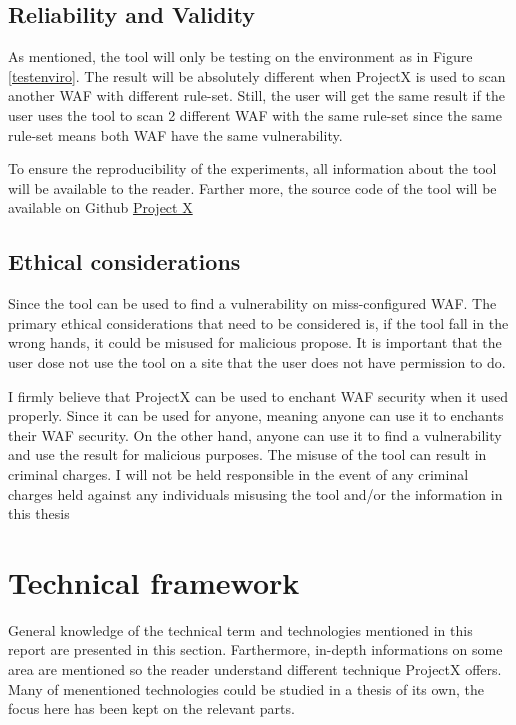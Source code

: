 \documentclass[a4paper,12pt]{article}
\begin{document}

\subsection{Reliability and Validity}
As mentioned, the tool will only be testing on the environment as in Figure \ref{testenviro}. The result will be absolutely different when ProjectX is used to scan another WAF with different rule-set. Still, the user will get the same result if the user uses the tool to scan 2 different WAF with the same rule-set since the same rule-set means both WAF have the same vulnerability. 

To ensure the reproducibility of the experiments, all information about the tool will be available to the reader. Farther more, the source code of the tool will be available on Github \href{https://github.com/}{Project X}

\subsection{Ethical considerations}
Since the tool can be used to find a vulnerability on miss-configured WAF. The primary ethical considerations that need to be considered is, if the tool fall in the wrong hands, it could be misused for malicious propose. It is important that the user dose not use the tool on a site that the user does not have permission to do. 

I firmly believe that ProjectX can be used to enchant WAF security when it used properly. Since it can be used for anyone, meaning anyone can use it to enchants their WAF security. On the other hand, anyone can use it to find a vulnerability and use the result for malicious purposes. The misuse of the tool can result in criminal charges. I will not be held responsible in the event of any criminal charges held against any individuals misusing the tool and/or the information in this thesis 

\newpage
\section{Technical framework}
General knowledge of the technical term and technologies mentioned in this report are presented in this section. Farthermore, in-depth informations on some area are mentioned so the reader understand different technique ProjectX offers. Many of menentioned technologies could be studied in a thesis of its own, the focus here has been kept on the relevant parts.
\end{document}
